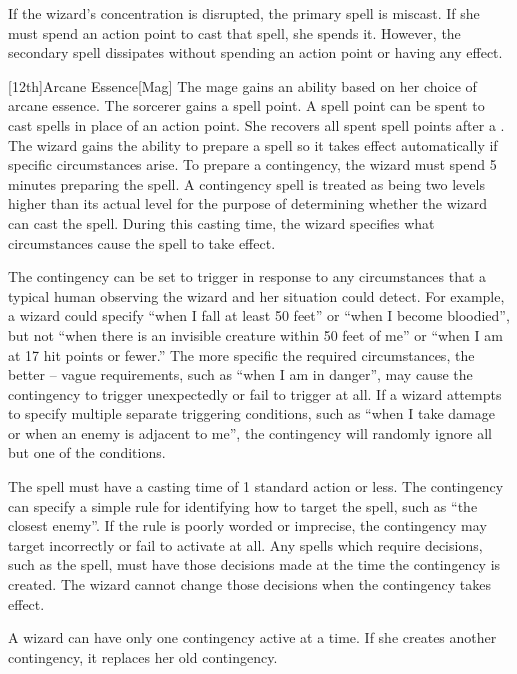         If the wizard's concentration is disrupted, the primary spell is miscast.
        If she must spend an action point to cast that spell, she spends it.
        However, the secondary spell dissipates without spending an action point or having any effect.

        [12th]{Arcane Essence}[Mag]
        The mage gains an ability based on her choice of arcane essence.
         The sorcerer gains a spell point.
        A spell point can be spent to cast spells in place of an action point.
        She recovers all spent spell points after a .
         The wizard gains the ability to prepare a spell so it takes effect automatically if specific circumstances arise.
        To prepare a contingency, the wizard must spend 5 minutes preparing the spell.
        A contingency spell is treated as being two levels higher than its actual level for the purpose of determining whether the wizard can cast the spell.
        During this casting time, the wizard specifies what circumstances cause the spell to take effect.

        The contingency can be set to trigger in response to any circumstances that a typical human observing the wizard and her situation could detect.
        For example, a wizard could specify ``when I fall at least 50 feet'' or ``when I become bloodied'', but not ``when there is an invisible creature within 50 feet of me'' or ``when I am at 17 hit points or fewer.'' The more specific the required circumstances, the better -- vague requirements, such as ``when I am in danger'', may cause the contingency to trigger unexpectedly or fail to trigger at all.
        If a wizard attempts to specify multiple separate triggering conditions, such as ``when I take damage or when an enemy is adjacent to me'', the contingency will randomly ignore all but one of the conditions.

        The spell must have a casting time of 1 standard action or less.
        The contingency can specify a simple rule for identifying how to target the spell, such as ``the closest enemy''.
        If the rule is poorly worded or imprecise, the contingency may target incorrectly or fail to activate at all.
        Any spells which require decisions, such as the  spell, must have those decisions made at the time the contingency is created.
        The wizard cannot change those decisions when the contingency takes effect.

        A wizard can have only one contingency active at a time.
        If she creates another contingency, it replaces her old contingency.


